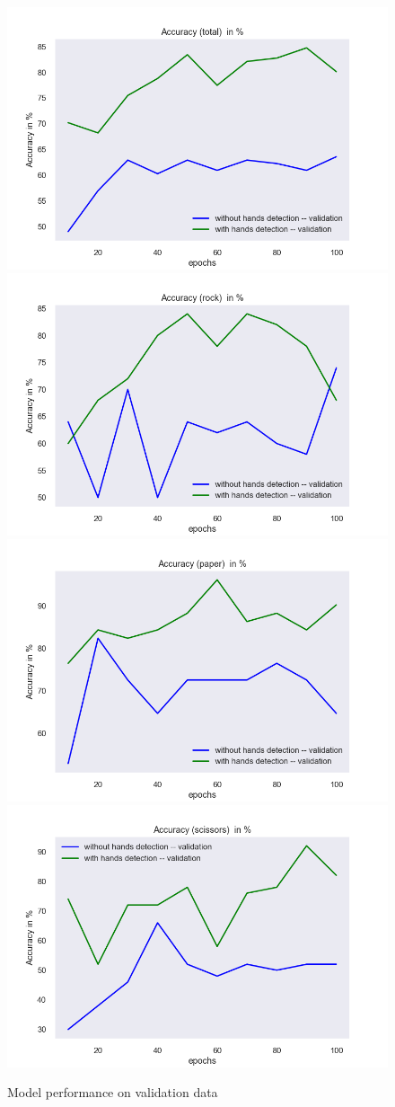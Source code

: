 \documentclass[a4paper]{article}
\begin{document}
\begin{figure}
    \includegraphics[width=.49\textwidth]{img/experiment/model_comp_10steps__val_acc_total.png}\hfill
    \includegraphics[width=.49\textwidth]{img/experiment/model_comp_10steps__val_acc_rock.png}\hfill
    \\[\smallskipamount]
    \includegraphics[width=.49\textwidth]{img/experiment/model_comp_10steps__val_acc_paper.png}\hfill
    \includegraphics[width=.49\textwidth]{img/experiment/model_comp_10steps__val_acc_scissors.png}\hfill
    \caption{Model performance on validation data}
    \label{fig:exp-de-acc-val}
\end{figure}
\end{document}
